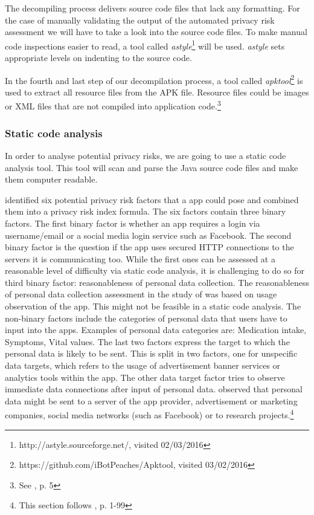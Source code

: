 \documentclass[
	a4paper,
	oneside,
	12pt,
	liststotocnumbered
]{article}
\let\cite\textcite
\begin{document}
The decompiling process delivers source code files that lack any formatting.
For the case of manually validating the output of the automated privacy risk assessment we will have to take a look into the source code files. 
To make manual code inspections easier to read, a tool called \textit{astyle}\footnote{http://astyle.sourceforge.net/, visited 02/03/2016} will be used. 
\textit{astyle} sets appropriate levels on indenting to the source code.

In the fourth and last step of our decompilation process, a tool called \textit{apktool}\footnote{https://github.com/iBotPeaches/Apktool, visited 03/02/2016} is used to extract all resource files from the \acs{APK} file. Resource files could be images or XML files that are not compiled into application code.\footnote{See \cite{xu2013techniques}, p. 5}

\subsubsection{Static code analysis}
In order to analyse potential privacy risks, we are going to use a static code analysis tool.
This tool will scan and parse the Java source code files and make them computer readable.

\cite{Bruggemann2016} identified six potential privacy risk factors that a \mH app could pose and combined them into a privacy risk index formula. 
The six factors contain three binary factors.
The first binary factor is whether an app requires a login via username/email or a social media login service such as Facebook. 
The second binary factor is the question if the app uses secured \acs{HTTP} connections to the servers it is communicating too.
While the first ones can be assessed at a reasonable level of difficulty via static code analysis, it is challenging to do so for third binary factor: reasonableness of personal data collection. 
The reasonableness of personal data collection assessment in the study of \cite{Bruggemann2016} was based on usage observation of the app. This might not be feasible in a static code analysis.
The non-binary factors include the categories of personal data that users have to input into the \mH apps. Examples of personal data categories are: Medication intake, Symptoms, Vital values.
The last two factors express the target to which the personal data is likely to be sent. 
This is split in two factors, one for unspecific data targets, which refers to the usage of advertisement banner services or analytics tools within the app. 
The other data target factor tries to observe immediate data connections after input of personal data. 
\cite{Bruggemann2016} observed that personal data might be sent to a server of the app provider, advertisement or marketing companies, social media networks (such as Facebook) or to research projects.\footnote{This section follows \cite{Bruggemann2016}, p. 1-99}
\end{document}
